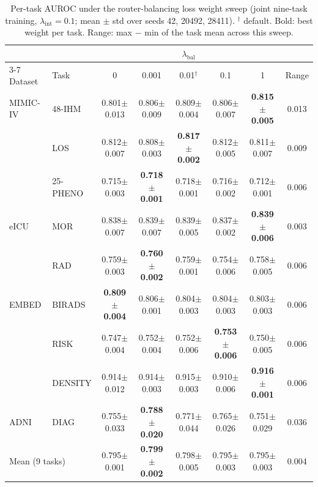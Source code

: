 \begin{table}[t]
\centering
\footnotesize
\setlength{\tabcolsep}{4pt}
\caption{Per-task AUROC under the router-balancing loss weight sweep (joint nine-task training, $\lambda_{\mathrm{int}}=0.1$; mean $\pm$ std over seeds 42, 20492, 28411). $^\dagger$ default. Bold: best weight per task. Range: max $-$ min of the task mean across this sweep.}
\label{tab:aux-bal-per-task}
\begin{tabular}{llcccccc}
\toprule
 & & \multicolumn{5}{c}{$\lambda_{\mathrm{bal}}$} & \\
\cmidrule(lr){3-7}
Dataset & Task & 0 & 0.001 & 0.01$^\dagger$ & 0.1 & 1 & Range \\
\midrule
MIMIC-IV & 48-IHM & 0.801{\scriptsize$\pm$0.013} & 0.806{\scriptsize$\pm$0.009} & 0.809{\scriptsize$\pm$0.004} & 0.806{\scriptsize$\pm$0.007} & \textbf{0.815{\scriptsize$\pm$0.005}} & 0.013 \\
 & LOS & 0.812{\scriptsize$\pm$0.007} & 0.808{\scriptsize$\pm$0.003} & \textbf{0.817{\scriptsize$\pm$0.002}} & 0.812{\scriptsize$\pm$0.005} & 0.811{\scriptsize$\pm$0.007} & 0.009 \\
 & 25-PHENO & 0.715{\scriptsize$\pm$0.003} & \textbf{0.718{\scriptsize$\pm$0.001}} & 0.718{\scriptsize$\pm$0.001} & 0.716{\scriptsize$\pm$0.002} & 0.712{\scriptsize$\pm$0.001} & 0.006 \\
\addlinespace[2pt]
eICU & MOR & 0.838{\scriptsize$\pm$0.007} & 0.839{\scriptsize$\pm$0.007} & 0.839{\scriptsize$\pm$0.005} & 0.837{\scriptsize$\pm$0.002} & \textbf{0.839{\scriptsize$\pm$0.006}} & 0.003 \\
 & RAD & 0.759{\scriptsize$\pm$0.003} & \textbf{0.760{\scriptsize$\pm$0.002}} & 0.759{\scriptsize$\pm$0.001} & 0.754{\scriptsize$\pm$0.006} & 0.758{\scriptsize$\pm$0.005} & 0.006 \\
\addlinespace[2pt]
EMBED & BIRADS & \textbf{0.809{\scriptsize$\pm$0.004}} & 0.806{\scriptsize$\pm$0.001} & 0.804{\scriptsize$\pm$0.003} & 0.804{\scriptsize$\pm$0.003} & 0.803{\scriptsize$\pm$0.003} & 0.006 \\
 & RISK & 0.747{\scriptsize$\pm$0.004} & 0.752{\scriptsize$\pm$0.004} & 0.752{\scriptsize$\pm$0.006} & \textbf{0.753{\scriptsize$\pm$0.006}} & 0.750{\scriptsize$\pm$0.005} & 0.006 \\
 & DENSITY & 0.914{\scriptsize$\pm$0.012} & 0.914{\scriptsize$\pm$0.003} & 0.915{\scriptsize$\pm$0.003} & 0.910{\scriptsize$\pm$0.006} & \textbf{0.916{\scriptsize$\pm$0.001}} & 0.006 \\
\addlinespace[2pt]
ADNI & DIAG & 0.755{\scriptsize$\pm$0.033} & \textbf{0.788{\scriptsize$\pm$0.020}} & 0.771{\scriptsize$\pm$0.044} & 0.765{\scriptsize$\pm$0.026} & 0.751{\scriptsize$\pm$0.029} & 0.036 \\
\midrule
\multicolumn{2}{l}{Mean (9 tasks)} & 0.795{\scriptsize$\pm$0.001} & \textbf{0.799{\scriptsize$\pm$0.002}} & 0.798{\scriptsize$\pm$0.005} & 0.795{\scriptsize$\pm$0.003} & 0.795{\scriptsize$\pm$0.003} & 0.004 \\
\bottomrule
\end{tabular}
\end{table}

